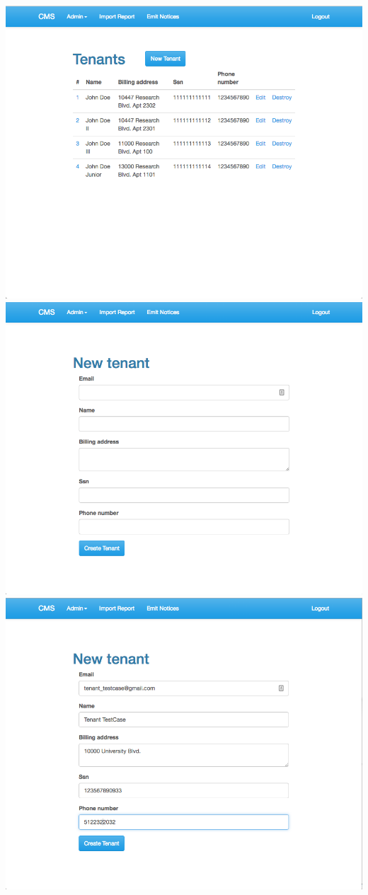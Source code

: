 \begin{itemize}
    \includegraphics[scale=0.25]{./images/ss/tenant/create/2.png}\\
    \includegraphics[scale=0.25]{./images/ss/tenant/create/3.png}
    \includegraphics[scale=0.25]{./images/ss/tenant/create/4.png}\\

\end{itemize}
